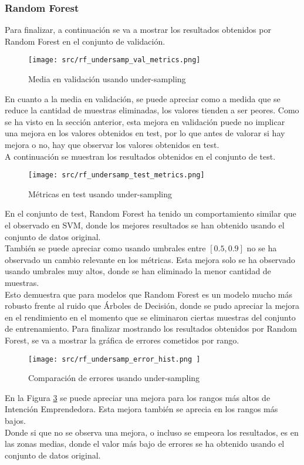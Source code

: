 \subsubsection*{Random Forest}
Para finalizar, a continuación se va a mostrar los resultados obtenidos por Random Forest en el conjunto de validación.
\begin{figure}[H]
	\centering
	\texttt{[image: src/rf\_undersamp\_val\_metrics.png]}
	\caption{Media en validación usando under-sampling}
	\label{fig:cmp_val_rf}
\end{figure}
En cuanto a la media en validación, se puede apreciar como a medida que se reduce la cantidad de muestras eliminadas, los valores tienden a ser peores. Como se ha visto en la sección anterior, esta mejora en validación puede no implicar una mejora en los valores obtenidos en test, por lo que antes de valorar si hay mejora o no, hay que observar los valores obtenidos en test.\\
\clearpage
A continuación se muestran los resultados obtenidos en el conjunto de test.
\begin{figure}[H]
	\centering
	\texttt{[image: src/rf\_undersamp\_test\_metrics.png]}
	\caption{Métricas en test usando under-sampling}
	\label{fig:cmp_test_rf}
\end{figure}
En el conjunto de test, Random Forest ha tenido un comportamiento similar que el observado en SVM, donde los mejores resultados se han obtenido usando el conjunto de datos original.\\
\linebreak
También se puede apreciar como usando umbrales entre $\left[0.5,0.9\right]$ no se ha observado un cambio relevante en los métricas. Esta mejora solo se ha observado usando umbrales muy altos, donde se han eliminado la menor cantidad de muestras.\\
\linebreak
Esto demuestra que para modelos que Random Forest es un modelo mucho más robusto frente al ruido que Árboles de Decisión, donde se pudo apreciar la mejora en el rendimiento en el momento que se eliminaron ciertas muestras del conjunto de entrenamiento. 
\clearpage
Para finalizar mostrando los resultados obtenidos por Random Forest, se va a mostrar la gráfica de errores cometidos por rango.
\begin{figure}[H]
	\centering
	\texttt{[image: src/rf\_undersamp\_error\_hist.png ]}
	\caption{Comparación de errores usando under-sampling}
	\label{fig:cmp_error_rf}
\end{figure}
En la Figura \ref{fig:cmp_error_rf} se puede apreciar una mejora para los rangos más altos de Intención Emprendedora. Esta mejora también se aprecia en los rangos más bajos. \\
Donde si que no se observa una mejora, o incluso se empeora los resultados, es en las zonas medias, donde el valor más bajo de errores se ha obtenido usando el conjunto de datos original.
\clearpage
